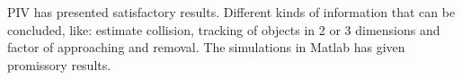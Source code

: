 
PIV has presented satisfactory results. Different kinds of information that can 
be concluded, like: estimate collision, tracking of
objects in 2 or 3 dimensions and factor of approaching and removal. 
The simulations in Matlab has given promissory results.
